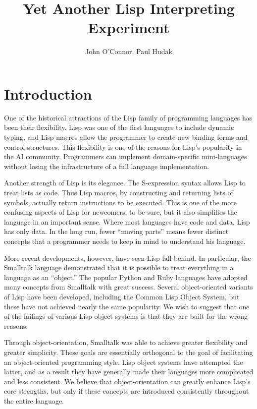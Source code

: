 \documentclass[twocolumn]{article}
\title{Yet Another Lisp Interpreting Experiment}
\author{John O'Connor, Paul Hudak}
\date{}
\begin{document}
\newcommand{\next}{\operatorname{next}}
\newcommand{\invoke}{\operatorname{invoke}}
\newcommand{\lookup}{\operatorname{lookup}}
\newcommand{\wrap}{\operatorname{wrap}}
\newcommand{\parse}{\operatorname{parse}}

\newcommand{\eval}{\texttt{eval}}
\newcommand{\call}{\texttt{call}}
\newcommand{\msg}{\texttt{msg}}

\newcommand{\lb}{\left<}
\newcommand{\rb}{\right>}

\maketitle

\section*{Introduction}
One of the historical attractions of the Lisp family of programming
languages has been their flexibility. Lisp was one of the first
languages to include dynamic typing, and Lisp macros allow the
programmer to create new binding forms and control structures. This
flexibility is one of the reasons for Lisp's popularity in the AI
community. Programmers can implement domain-specific mini-languages
without losing the infrastructure of a full language implementation.

Another strength of Lisp is its elegance. The S-expression syntax
allows Lisp to treat lists as code. Thus Lisp macros, by constructing
and returning lists of symbols, actually return instructions to be
executed. This is one of the more confusing aspects of Lisp for
newcomers, to be sure, but it also simplifies the language in an
important sense. Where most languages have code and data, Lisp has
only data. In the long run, fewer ``moving parts'' means fewer
distinct concepts that a programmer needs to keep in mind to
understand his language.

More recent developments, however, have seen Lisp fall behind. In
particular, the Smalltalk language demonstrated that it is possible to
treat everything in a language as an ``object.'' The popular Python
and Ruby languages have adopted many concepts from Smalltalk with
great success. Several object-oriented variants of Lisp have been
developed, including the Common Lisp Object System, but these have not
achieved nearly the same popularity. We wish to suggest that one of
the failings of various Lisp object systems is that they are built for
the wrong reasons.

Through object-orientation, Smalltalk was able to achieve greater
flexibility and greater simplicity. These goals are essentially
orthogonal to the goal of facilitating an object-oriented programming
style. Lisp object systems have attempted the latter, and as a result
they have generally made their languages more complicated and less
consistent. We believe that object-orientation can greatly enhance
Lisp's core strengths, but only if these concepts are introduced
consistently throughout the entire language.
\end{document}
